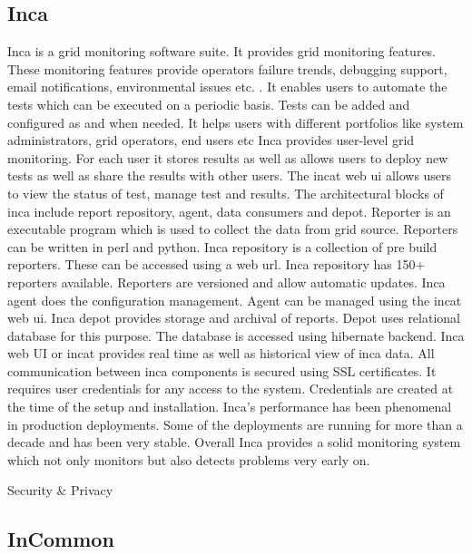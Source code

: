 \subsection{ Inca}

     Inca is a grid monitoring \cite{inca-book} software suite. It
     provides grid monitoring features. These monitoring features
     provide operators failure trends, debugging support, email
     notifications, environmental issues etc. \cite{www-inca}. It
     enables users to automate the tests which can be executed on a
     periodic basis. Tests can be added and configured as and when
     needed. It helps users with different portfolios like system
     administrators, grid operators, end users etc Inca provides
     user-level grid monitoring. For each user it stores results as
     well as allows users to deploy new tests as well as share the
     results with other users. The incat web ui allows users to view
     the status of test, manage test and results. The architectural
     blocks of inca include report repository, agent, data consumers
     and depot. Reporter is an executable program which is used to
     collect the data from grid source. Reporters can be written in
     perl and python. Inca repository is a collection of pre build
     reporters.  These can be accessed using a web url. Inca
     repository has 150+ reporters available. Reporters are versioned
     and allow automatic updates. Inca agent does the configuration
     management. Agent can be managed using the incat web ui. Inca
     depot provides storage and archival of reports. Depot uses
     relational database for this purpose. The database is accessed
     using hibernate backend.  Inca web UI or incat provides real time
     as well as historical view of inca data.  All communication
     between inca components is secured using SSL certificates. It
     requires user credentials for any access to the
     system. Credentials are created at the time of the setup and
     installation. Inca's performance has been phenomenal in
     production deployments. Some of the deployments are running for
     more than a decade and has been very stable. Overall Inca
     provides a solid monitoring system which not only monitors but
     also detects problems very early on.

Security \& Privacy

\subsection{ InCommon}

